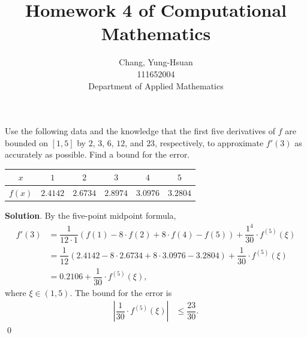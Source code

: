 \documentclass[11pt]{article}
\title{Homework 4 of Computational Mathematics}
\author{Chang, Yung-Hsuan\\111652004\\Department of Applied Mathematics}
\theoremstyle{break}
\numberwithin{equation}{theorem}
\begin{document}
\maketitle
\thispagestyle{empty}
\newpage
{}

\begin{problem}\label{problem 1} %
    Use the following data and the knowledge that the first five derivatives of $f$ are bounded on $[1, 5]$ by $2$, $3$, $6$, $12$, and $23$, respectively, to approximate $f'(3)$ as accurately as possible. Find a bound for the error.
    \begin{center}
        \begin{tabular}{c|c|c|c|c|c}
            $x$ & $1$ & $2$ & $3$ & $4$ & $5$ \\
            \hline
            $f(x)$ & $2.4142$ & $2.6734$ & $2.8974$ & $3.0976$ & $3.2804$
        \end{tabular}
    \end{center}
\end{problem}
\textbf{Solution}. By the five-point midpoint formula, \begin{align*}
    f'(3)&=\dfrac{1}{12\cdot 1}\left(f(1)-8\cdot f(2)+8\cdot f(4)-f(5)\right)+\dfrac{1^4}{30}\cdot f^{(5)}(\xi)\\
    &=\dfrac{1}{12}\left(2.4142-8\cdot 2.6734+8\cdot 3.0976-3.2804\right)+\dfrac{1}{30}\cdot f^{(5)}(\xi)\\
    &=0.2106+\dfrac{1}{30}\cdot f^{(5)}(\xi),
\end{align*}
where $\xi\in(1, 5)$. The bound for the error is \begin{align*}
    \left|\dfrac{1}{30}\cdot f^{(5)}(\xi)\right|&\leq\dfrac{23}{30}.
\end{align*} \qed
\end{document}
